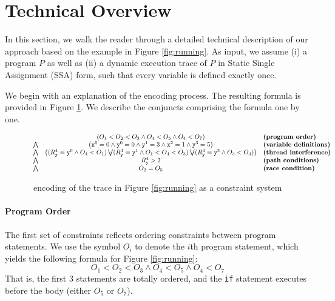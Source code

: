 \section{Technical Overview}\label{Se:techoverview}

In this section, we walk the reader through a detailed technical description of our approach based on the example in Figure \ref{fig:running}. 
%
As input, we assume (i) a program $P$ as well as (ii) a dynamic execution trace of $P$ in Static Single Assignment (SSA) form, such that every variable is defined exactly once.

We begin with an explanation of the encoding process. The resulting formula is provided in Figure \ref{fig:encoding}. We describe the conjuncts comprising the formula one by one.

\begin{figure*}
	\begin{center}
$$
	\begin{array}{rcl}
	& \left( O_1 < O_2 < O_3 \wedge O_4 < O_5 \wedge O_4 < O_7 \right) & \textbf{(program order)} \\
\bigwedge & \left( {\tt x}^0 = 0 \wedge {\tt y}^0 = 0 \wedge {\tt y}^1 = 3 \wedge 
	{\tt x}^2 = 1 \wedge {\tt y}^3 = 5 \right) & \textbf{(variable definitions)} \\
\bigwedge & \left(		(R_{\tt y}^4={\tt y}^0 \wedge O_4 < O_1) \bigvee	
(R_{\tt y}^4={\tt y}^1 \wedge O_1 < O_4 < O_3) \bigvee
(R_{\tt y}^4={\tt y}^3 \wedge O_3 < O_4)
		\right) & \textbf{(thread interference)} \\
\bigwedge & R_{\tt y}^4 > 2 & \textbf{(path conditions)} \\
\bigwedge & O_2 = O_5 & \textbf{(race condition)}
	\end{array} 
$$
\end{center}
\caption{\label{fig:encoding}\tool\ encoding of the trace in Figure \ref{fig:running} as a constraint system}
\end{figure*}

\paragraph{Program Order} The first set of constraints reflects ordering constraints between program statements. We use the symbol $O_i$ to denote the $i$th program statement, which yields the following formula for Figure \ref{fig:running}:
$$
	O_1 < O_2 < O_3 \wedge O_4 < O_5 \wedge O_4 < O_7
$$
That is, the first 3 statements are totally ordered, and the {\tt if} statement executes before the body (either $O_5$ or $O_7$).

